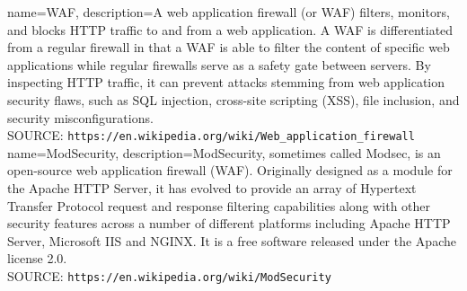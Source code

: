 {
	name=WAF,
	description={A web application firewall (or WAF) filters, monitors, and blocks HTTP traffic to and from a web application. A WAF is differentiated from a regular firewall in that a WAF is able to filter the content of specific web applications while regular firewalls serve as a safety gate between servers. By inspecting HTTP traffic, it can prevent attacks stemming from web application security flaws, such as SQL injection, cross-site scripting (XSS), file inclusion, and security misconfigurations.  \\SOURCE: \texttt{https://en.wikipedia.org/wiki/Web\_application\_firewall}}
}
{
	name=ModSecurity,
	description={ModSecurity, sometimes called Modsec, is an open-source web application firewall (WAF). Originally designed as a module for the Apache HTTP Server, it has evolved to provide an array of Hypertext Transfer Protocol request and response filtering capabilities along with other security features across a number of different platforms including Apache HTTP Server, Microsoft IIS and NGINX. It is a free software released under the Apache license 2.0.   \\SOURCE: \texttt{https://en.wikipedia.org/wiki/ModSecurity}}
}
